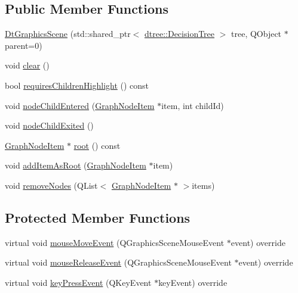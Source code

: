 \subsection*{Public Member Functions}
\begin{DoxyCompactItemize}
\item 
\mbox{\hyperlink{class_dt_graphics_scene_a1d5b3a478ffdac60c0a6c85f50123aa6}{Dt\+Graphics\+Scene}} (std\+::shared\+\_\+ptr$<$ \mbox{\hyperlink{classdtree_1_1_decision_tree}{dtree\+::\+Decision\+Tree}} $>$ tree, Q\+Object $\ast$parent=0)
\item 
void \mbox{\hyperlink{class_dt_graphics_scene_a1fa041b4c7acb828f5eb525fd5d26de8}{clear}} ()
\item 
bool \mbox{\hyperlink{class_dt_graphics_scene_a9242cd023eace508f093bc15adbc236b}{requires\+Children\+Highlight}} () const
\item 
void \mbox{\hyperlink{class_dt_graphics_scene_a0864c9ffbae4f81223173131194efa49}{node\+Child\+Entered}} (\mbox{\hyperlink{class_graph_node_item}{Graph\+Node\+Item}} $\ast$item, int child\+Id)
\item 
void \mbox{\hyperlink{class_dt_graphics_scene_a8276855fdb1369e62504f559cb519877}{node\+Child\+Exited}} ()
\item 
\mbox{\hyperlink{class_graph_node_item}{Graph\+Node\+Item}} $\ast$ \mbox{\hyperlink{class_dt_graphics_scene_a5f716cbdd6ce35d0e8bf5e46c2119795}{root}} () const
\item 
void \mbox{\hyperlink{class_dt_graphics_scene_a609f35deb80018bf48f3b8c5d3d19d6b}{add\+Item\+As\+Root}} (\mbox{\hyperlink{class_graph_node_item}{Graph\+Node\+Item}} $\ast$item)
\item 
void \mbox{\hyperlink{class_dt_graphics_scene_a5a87dbd9ad60029387bfcef34b299034}{remove\+Nodes}} (Q\+List$<$ \mbox{\hyperlink{class_graph_node_item}{Graph\+Node\+Item}} $\ast$ $>$items)
\end{DoxyCompactItemize}
\subsection*{Protected Member Functions}
\begin{DoxyCompactItemize}
\item 
virtual void \mbox{\hyperlink{class_dt_graphics_scene_a886a903486f15de7f4e571cb2c2abf36}{mouse\+Move\+Event}} (Q\+Graphics\+Scene\+Mouse\+Event $\ast$event) override
\item 
virtual void \mbox{\hyperlink{class_dt_graphics_scene_a7ecab6ba9478527cabd5c06606375703}{mouse\+Release\+Event}} (Q\+Graphics\+Scene\+Mouse\+Event $\ast$event) override
\item 
virtual void \mbox{\hyperlink{class_dt_graphics_scene_a68ed8c9c3767f39543a17c8879931787}{key\+Press\+Event}} (Q\+Key\+Event $\ast$key\+Event) override
\end{DoxyCompactItemize}


